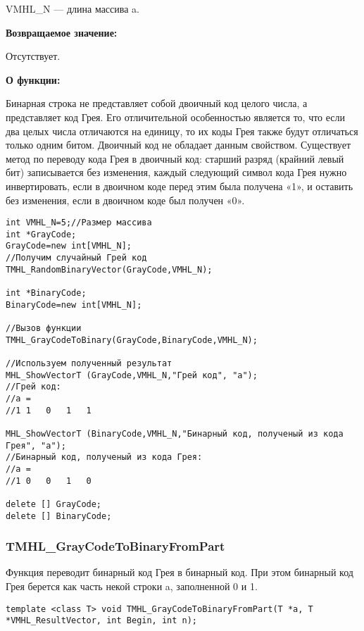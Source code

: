 \documentclass[a4paper,12pt]{article}
\begin{document}
 VMHL\_N --- длина массива a.
 
\textbf{Возвращаемое значение:}

 Отсутствует.
 
\textbf{О функции:}

Бинарная строка не представляет собой двоичный код целого числа, а представляет код Грея. Его отличительной особенностью является то, что если два целых числа отличаются на единицу, то их коды Грея также будут отличаться только одним битом. Двоичный код не обладает данным свойством.
Существует метод по переводу кода Грея в двоичный код: старший разряд (крайний левый бит) записывается без изменения, каждый следующий символ кода Грея нужно инвертировать, если в двоичном коде перед этим была получена «1», и оставить без изменения, если в двоичном коде был получен «0». 


\begin{lstlisting}[label=code_use_TMHL_GrayCodeToBinary,caption=Пример использования]
int VMHL_N=5;//Размер массива
int *GrayCode;
GrayCode=new int[VMHL_N];
//Получим случайный Грей код
TMHL_RandomBinaryVector(GrayCode,VMHL_N);

int *BinaryCode;
BinaryCode=new int[VMHL_N];

//Вызов функции
TMHL_GrayCodeToBinary(GrayCode,BinaryCode,VMHL_N);

//Используем полученный результат
MHL_ShowVectorT (GrayCode,VMHL_N,"Грей код", "a");
//Грей код:
//a =
//1	1	0	1	1

MHL_ShowVectorT (BinaryCode,VMHL_N,"Бинарный код, полученый из кода Грея", "a");
//Бинарный код, полученый из кода Грея:
//a =
//1	0	0	1	0

delete [] GrayCode;
delete [] BinaryCode;
\end{lstlisting}

\subsubsection{TMHL\_GrayCodeToBinaryFromPart}\label{TMHL_GrayCodeToBinaryFromPart}

Функция переводит бинарный код Грея в бинарный код. При этом бинарный код Грея берется как часть некой строки a, заполненной 0 и 1.


\begin{lstlisting}[label=code_syntax_TMHL_GrayCodeToBinaryFromPart,caption=Синтаксис]
template <class T> void TMHL_GrayCodeToBinaryFromPart(T *a, T *VMHL_ResultVector, int Begin, int n);
\end{lstlisting}
\end{document}
